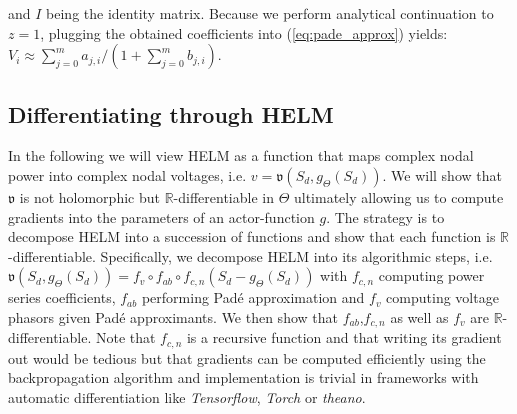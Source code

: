  and $I$ being the identity matrix. Because we perform analytical continuation to $z=1$, plugging the obtained coefficients into (\ref{eq:pade_approx}) yields: $V_i \approx \sum_{j=0}^m a_{j,i} / (1+\sum_{j=0}^m b_{j,i})$.

\subsection{Differentiating through HELM}
In the following we will view HELM as a function that maps complex nodal power into complex nodal voltages, i.e. $v = \mathfrak{v}(S_d,g_\Theta(S_d))$. We will show that $\mathfrak{v}$ is not holomorphic but $\mathbb{R}$-differentiable in $\Theta$ ultimately allowing us to compute gradients into the parameters of an actor-function $g$. The strategy is to decompose HELM into a succession of functions and show that each function is $\mathbb{R}$-differentiable. Specifically, we decompose HELM into its algorithmic steps, i.e. $\mathfrak{v}(S_d,g_\Theta(S_d)) = f_v \circ f_{ab} \circ f_{c,n} (S_d-g_\Theta(S_d))$ with $f_{c,n}$ computing power series coefficients, $f_{ab}$ performing Pad\'e approximation and $f_v$ computing voltage phasors given Pad\'e approximants. We then show that $f_{ab}$,$f_{c,n}$ as well as $f_{v}$ are $\mathbb{R}$-differentiable. Note that $f_{c,n}$ is a recursive function and that writing its gradient out would be tedious but that gradients can be computed efficiently using the backpropagation algorithm and implementation is trivial in frameworks with automatic differentiation like \emph{Tensorflow}, \emph{Torch} or \emph{theano}.

